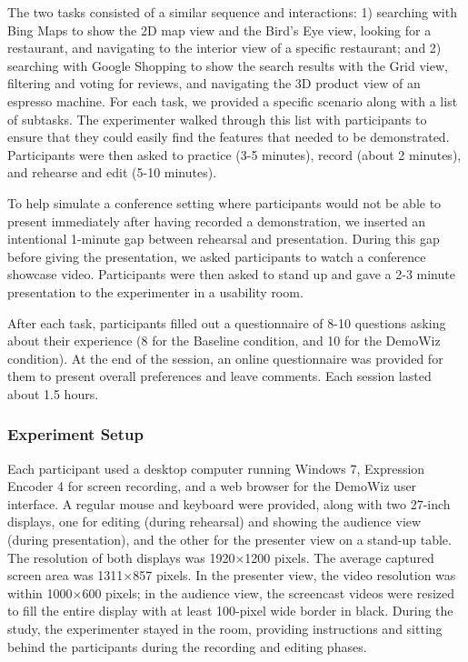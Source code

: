 The two tasks consisted of a similar sequence and interactions: 1) searching with Bing Maps to show the 2D map view and the Bird's Eye view, looking for a restaurant, and navigating to the interior view of a specific restaurant; and 2) searching with Google Shopping to show the search results with the Grid view, filtering and voting for reviews, and navigating the 3D product view of an espresso machine. For each task, we provided a specific scenario along with a list of subtasks. The experimenter walked through this list with participants to ensure that they could easily find the features that needed to be demonstrated. Participants were then asked to practice (3-5 minutes), record (about 2 minutes), and rehearse and edit (5-10 minutes).

To help simulate a conference setting where participants would not be able to present immediately after having recorded a demonstration, we inserted an intentional 1-minute gap between rehearsal and presentation. During this gap before giving the presentation, we asked participants to watch a conference showcase video. Participants were then asked to stand up and gave a 2-3 minute presentation to the experimenter in a usability room.

After each task, participants filled out a questionnaire of 8-10 questions asking about their experience (8 for the Baseline condition, and 10 for the DemoWiz condition). At the end of the session, an online questionnaire was provided for them to present overall preferences and leave comments. Each session lasted about 1.5 hours.

\subsubsection{Experiment Setup}
Each participant used a desktop computer running Windows 7, Expression Encoder 4 for screen recording, and a web browser for the DemoWiz user interface. A regular mouse and keyboard were provided, along with two 27-inch displays, one for editing (during rehearsal) and showing the audience view (during presentation), and the other for the presenter view on a stand-up table. The resolution of both displays was 1920×1200 pixels. The average captured screen area was 1311×857 pixels. In the presenter view, the video resolution was within 1000×600 pixels; in the audience view, the screencast videos were resized to fill the entire display with at least 100-pixel wide border in black. During the study, the experimenter stayed in the room, providing instructions and sitting behind the participants during the recording and editing phases.

